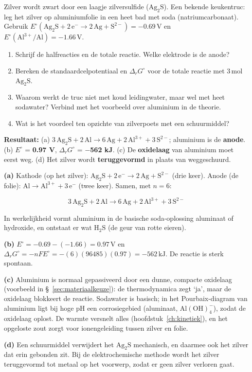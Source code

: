 \begin{oefening}
Zilver wordt zwart door een laagje zilversulfide (\(\mathrm{Ag_2S}\)). Een bekende keukentruc: leg het zilver op aluminiumfolie in een heet bad met soda (natriumcarbonaat). Gebruik \(E^\circ(\mathrm{Ag_2S + 2\,e^- \rightarrow 2\,Ag + S^{2-}}) = -0.69\,\mathrm{V}\) en \(E^\circ(\mathrm{Al^{3+}/Al}) = -1.66\,\mathrm{V}\).

\begin{enumerate}
\item[(a)]
  Schrijf de halfreacties en de totale reactie. Welke elektrode is de anode?
\item[(b)]
  Bereken de standaardcelpotentiaal en \(\Delta_r G^\circ\) voor de totale reactie met \(3\,\mathrm{mol}\) \(\mathrm{Ag_2S}\).
\item[(c)]
  Waarom werkt de truc niet met koud leidingwater, maar wel met heet sodawater? Verbind met het voorbeeld over aluminium in de theorie.
\item[(d)]
  Wat is het voordeel ten opzichte van zilverpoets met een schuurmiddel?
\end{enumerate}
\end{oefening}
\begin{oplossing}
\textbf{Resultaat:} (a) \(\mathrm{3\,Ag_2S + 2\,Al \rightarrow 6\,Ag + 2\,Al^{3+} + 3\,S^{2-}}\); aluminium is de \textbf{anode}. (b) \(E^\circ\) = \textbf{0.97 V}, \(\Delta_r G^\circ\) = \textbf{\ensuremath{-}562 kJ}. (c) De \textbf{oxidelaag} van aluminium moet eerst weg. (d) Het zilver wordt \textbf{teruggevormd} in plaats van weggeschuurd.

\textbf{(a)} Kathode (op het zilver): \(\mathrm{Ag_2S + 2\,e^- \rightarrow 2\,Ag + S^{2-}}\) (drie keer). Anode (de folie): \(\mathrm{Al \rightarrow Al^{3+} + 3\,e^-}\) (twee keer). Samen, met \(n = 6\):

\[
\mathrm{3\,Ag_2S + 2\,Al \rightarrow 6\,Ag + 2\,Al^{3+} + 3\,S^{2-}}
\]

In werkelijkheid vormt aluminium in de basische soda-oplossing aluminaat of hydroxide, en ontstaat er wat \(\mathrm{H_2S}\) (de geur van rotte eieren).

\textbf{(b)} \(E^\circ = -0.69 - (-1.66) = 0.97\,\mathrm{V}\) en \(\Delta_r G^\circ = -nFE^\circ = -(6)(96485)(0.97) = -562\,\mathrm{kJ}\). De reactie is sterk spontaan.

\textbf{(c)} Aluminium is normaal gepassiveerd door een dunne, compacte oxidelaag (voorbeeld in \S~\ref{sec:materiaalkeuze}): de thermodynamica zegt `ja', maar de oxidelaag blokkeert de reactie. Sodawater is basisch; in het Pourbaix-diagram van aluminium ligt bij hoge pH een corrosiegebied (aluminaat, \(\mathrm{Al(OH)_4^-}\)), zodat de oxidelaag oplost. De warmte versnelt alles (hoofdstuk~\ref{ch:kinetiek}), en het opgeloste zout zorgt voor ionengeleiding tussen zilver en folie.

\textbf{(d)} Een schuurmiddel verwijdert het \(\mathrm{Ag_2S}\) mechanisch, en daarmee ook het zilver dat erin gebonden zit. Bij de elektrochemische methode wordt het zilver teruggevormd tot metaal op het voorwerp, zodat er geen zilver verloren gaat.
\end{oplossing}

